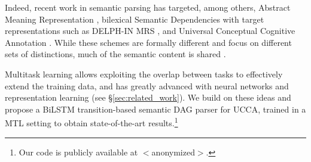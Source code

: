 \documentclass[11pt,a4paper]{article}
\begin{document}
Indeed, recent work in semantic parsing has targeted, among others,
Abstract Meaning Representation \cite[AMR;][]{banarescu2013abstract,damonte-17,Buys2017RobustIN},
bilexical Semantic Dependencies \cite[SDP;][]{oepen2014semeval,oepen2015semeval,oepen2016towards,P17-1186}
with target representations such as DELPH-IN MRS \cite[DM;][]{flickinger2012deepbank},
and Universal Conceptual Cognitive Annotation \cite[UCCA;][]{abend2013universal,hershcovich2017a}.
While these schemes are formally different and focus on different sets of distinctions,
much of the semantic content is shared \cite{abend2017state}.


Multitask learning \cite[MTL; ][]{caruana1998multitask} allows exploiting the overlap between tasks
to effectively extend the training data,
and has greatly advanced with neural networks and representation learning
(see \S\ref{sec:related_work}).
We build on these ideas and propose a BiLSTM transition-based semantic DAG parser for UCCA,
trained in a MTL setting to obtain state-of-the-art 
results.\footnote{Our code is publicly available at $<$anonymized$>$.}
\end{document}
